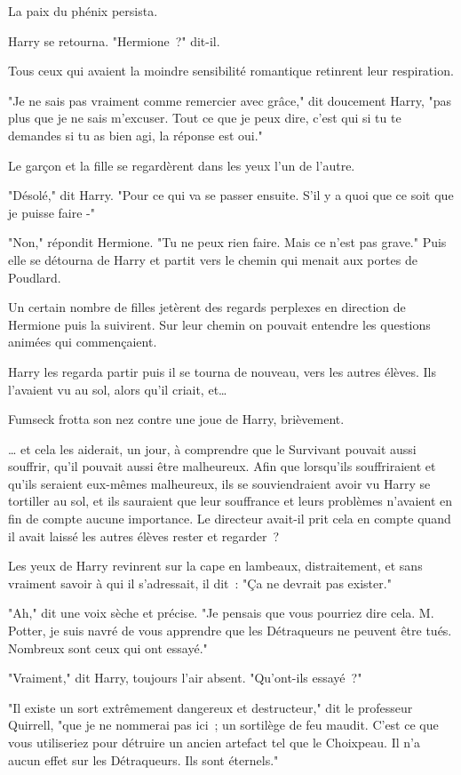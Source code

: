 La paix du phénix persista.

Harry se retourna. "Hermione~?" dit-il.

Tous ceux qui avaient la moindre sensibilité romantique retinrent leur respiration.

"Je ne sais pas vraiment comme remercier avec grâce," dit doucement Harry, "pas plus que je ne sais m'excuser. Tout ce que je peux dire, c'est qui si tu te demandes si tu as bien agi, la réponse est oui."

Le garçon et la fille se regardèrent dans les yeux l'un de l'autre.

"Désolé," dit Harry. "Pour ce qui va se passer ensuite. S'il y a quoi que ce soit que je puisse faire -"

"Non," répondit Hermione. "Tu ne peux rien faire. Mais ce n'est pas grave." Puis elle se détourna de Harry et partit vers le chemin qui menait aux portes de Poudlard.

Un certain nombre de filles jetèrent des regards perplexes en direction de Hermione puis la suivirent. Sur leur chemin on pouvait entendre les questions animées qui commençaient.

Harry les regarda partir puis il se tourna de nouveau, vers les autres élèves. Ils l'avaient vu au sol, alors qu'il criait, et…

Fumseck frotta son nez contre une joue de Harry, brièvement.

… et cela les aiderait, un jour, à comprendre que le Survivant pouvait aussi souffrir, qu'il pouvait aussi être malheureux. Afin que lorsqu'ils souffriraient et qu'ils seraient eux-mêmes malheureux, ils se souviendraient avoir vu Harry se tortiller au sol, et ils sauraient que leur souffrance et leurs problèmes n'avaient en fin de compte aucune importance. Le directeur avait-il prit cela en compte quand il avait laissé les autres élèves rester et regarder~?

Les yeux de Harry revinrent sur la cape en lambeaux, distraitement, et sans vraiment savoir à qui il s'adressait, il dit~: "Ça ne devrait pas exister."

"Ah," dit une voix sèche et précise. "Je pensais que vous pourriez dire cela. M. Potter, je suis navré de vous apprendre que les Détraqueurs ne peuvent être tués. Nombreux sont ceux qui ont essayé."

"Vraiment," dit Harry, toujours l'air absent. "Qu'ont-ils essayé~?"

"Il existe un sort extrêmement dangereux et destructeur," dit le professeur Quirrell, "que je ne nommerai pas ici~; un sortilège de feu maudit. C'est ce que vous utiliseriez pour détruire un ancien artefact tel que le Choixpeau. Il n'a aucun effet sur les Détraqueurs. Ils sont éternels."

